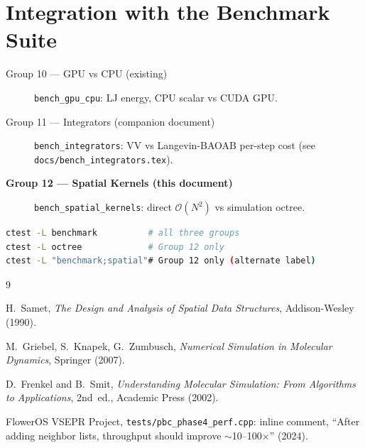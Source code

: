 \documentclass[11pt,a4paper]{article}
\theoremstyle{definition}
\theoremstyle{plain}
\newcommand{\Otwo}{\mathcal{O}(N^2)}
\begin{document}
\section{Integration with the Benchmark Suite}
\label{sec:suite}

\begin{description}
  \item[Group 10 — GPU vs CPU (existing)] \texttt{bench\_gpu\_cpu}:
	LJ energy, CPU scalar vs CUDA GPU.
  \item[Group 11 — Integrators (companion document)]
	\texttt{bench\_integrators}: VV vs Langevin-BAOAB per-step cost
	(see \texttt{docs/bench\_integrators.tex}).
  \item[\textbf{Group 12 — Spatial Kernels (this document)}]
	\texttt{bench\_spatial\_kernels}: direct $\Otwo$ vs simulation octree.
\end{description}

\begin{lstlisting}[language=bash,basicstyle=\ttfamily\small]
ctest -L benchmark          # all three groups
ctest -L octree             # Group 12 only
ctest -L "benchmark;spatial"# Group 12 only (alternate label)
\end{lstlisting}

\begin{thebibliography}{9}

H.~Samet,
\emph{The Design and Analysis of Spatial Data Structures},
Addison-Wesley (1990).

M.~Griebel, S.~Knapek, G.~Zumbusch,
\emph{Numerical Simulation in Molecular Dynamics},
Springer (2007).

D.~Frenkel and B.~Smit,
\emph{Understanding Molecular Simulation: From Algorithms to Applications},
2nd~ed., Academic Press (2002).

FlowerOS VSEPR Project,
\texttt{tests/pbc\_phase4\_perf.cpp}: inline comment,
``After adding neighbor lists, throughput should improve $\sim$10--100$\times$'' (2024).

\end{thebibliography}
\end{document}
